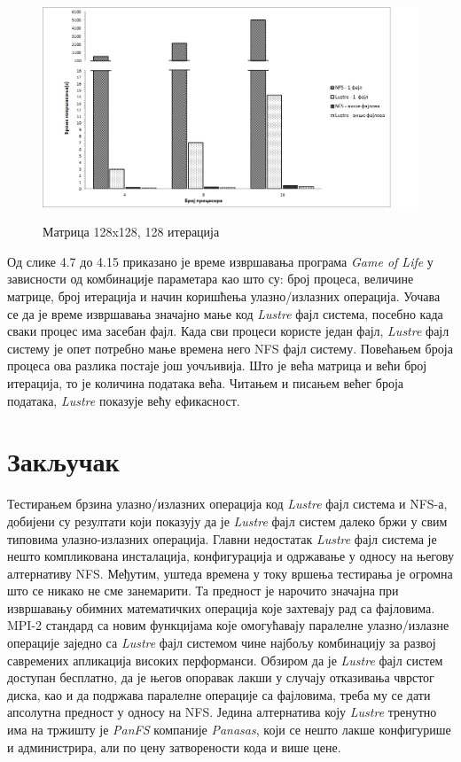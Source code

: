       \begin{figure}[H]
        \centering
            \includegraphics[width=1\textwidth]{slike/results/128_128.png}\\[1cm]
       \caption{Матрица 128x128, 128 итерација}
      \end{figure}
  
Од слике 4.7 до 4.15 приказано је време извршавања програма \textit{Game of Life} у зависности од комбинације параметара као што су: број процеса, величине матрице, број итерација и начин коришћења улазно/излазних операција. Уочава се да је време извршавања значајно мање код \textit{Lustre} фајл система, посебно када сваки процес има засебан фајл. Када сви процеси користе један фајл, \textit{Lustre} фајл систему је опет потребно мање времена него NFS фајл систему. Повећањем броја процеса ова разлика постаје још уочљивија. 
Што је већа матрица и већи број итерација, то је количина података већа. Читањем и писањем већег броја података, \textit{Lustre} показује већу ефикасност. 
  
    
\chapter{Закључак}     


 Тестирањем брзина улазно/излазних операција код \textit{Lustre} фајл система и NFS-а, добијени су резултати који показују да је  \textit{Lustre} фајл систем далеко бржи у свим типовима улазно-излазних операција. Главни недостатак \textit{Lustre} фајл система је нешто компликована инсталација, конфигурација и одржавање у односу на његову алтернативу NFS. Међутим, уштеда времена у току вршења тестирања је огромна што се никако не сме занемарити. Та предност је нарочито значајна при извршавању обимних математичких операција које захтевају рад са фајловима. MPI-2 стандард са новим функцијама које омогућавају паралелне улазно/излазне операције заједно са \textit{Lustre} фајл системом чине најбољу комбинацију за развој савремених апликација високих перформанси. Обзиром да је \textit{Lustre} фајл систем доступан бесплатно, да је његов опоравак лакши у случају отказивања чврстог диска, као и да подржава паралелне операције са фајловима, треба му се дати апсолутна предност у односу на NFS. Једина алтернатива коју \textit{Lustre} тренутно има на тржишту је \textit{PanFS} компаније \textit{Panasas}, који се нешто лакше конфигурише и администрира, али по цену затворености кода и више цене. 
 
